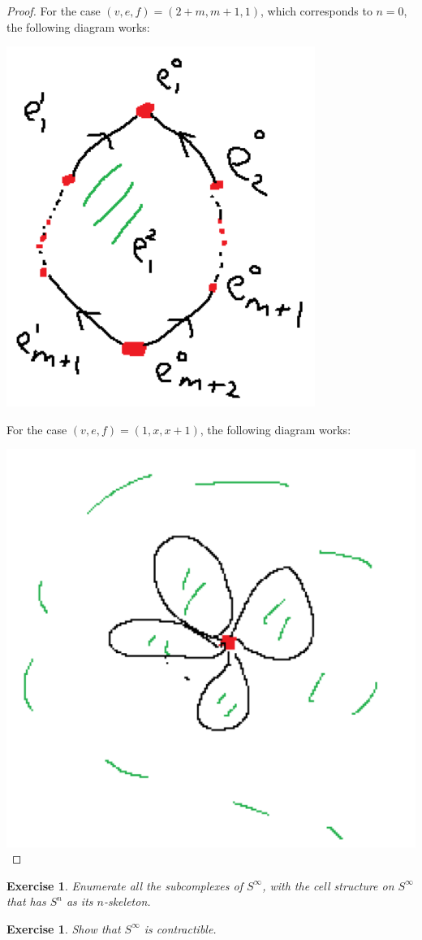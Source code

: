 \documentclass{article}
\newtheorem{exercise}[theorem]{Exercise}
\begin{document}
\begin{proof}
For the case $(v,e,f)=(2+m,m+1,1)$, which corresponds to $n=0$, the following diagram works:

\includegraphics[scale=0.5]{Screenshot (1343).png}

For the case $(v,e,f)=(1,x,x+1)$, the following diagram works:

\includegraphics[scale=0.5]{Screenshot (1344).png}
\end{proof}

\begin{exercise}
Enumerate all the subcomplexes of $S^\infty$, with the cell structure on $S^\infty$ that has $S^n$ as its $n$-skeleton.
\end{exercise}

\begin{exercise}
Show that $S^\infty$ is contractible.
\end{exercise}
\end{document}
